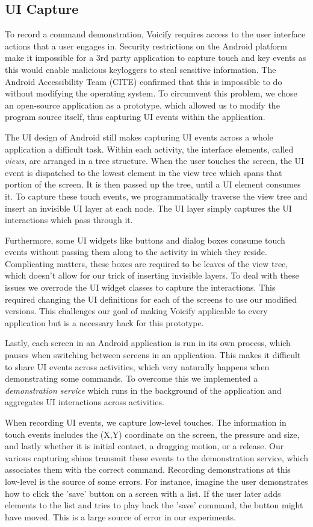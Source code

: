 \documentclass[letterpaper]{article}
\begin{document}
\subsection{UI Capture}
To record a command demonstration, Voicify requires access to the user interface actions that a user engages in.
Security restrictions on the Android platform make it impossible for a 3rd party application to capture 
touch and key events as this would enable malicious keyloggers to steal sensitive information. 
The Android Accessibility Team (CITE) confirmed that this is impossible to do without modifying the operating system.
To circumvent this problem, we chose an open-source application as a prototype, which allowed us to modify
the program source itself, thus capturing UI events within the application.

The UI design of Android still makes capturing UI events across a whole application a difficult task.
Within each activity, the interface elements, called \emph{views}, are arranged in a tree structure. When the user
touches the screen, the UI event is dispatched to the lowest element in the view tree which spans that portion of the 
screen. It is then passed up the tree, until a UI element consumes it. To capture these touch events,
we programmatically traverse the view tree and insert an invisible UI layer at each node. The UI layer
simply captures the UI interactions which pass through it.

Furthermore, some UI widgets like buttons and dialog boxes consume touch events without passing them along
to the activity in which they reside. Complicating matters, these boxes are required to be leaves
of the view tree, which doesn't allow for our trick of inserting invisible layers. To deal with these issues
we overrode the UI widget classes to capture the interactions. This required changing the UI definitions for
each of the screens to use our modified versions. This challenges our goal of making Voicify applicable to
every application but is a necessary hack for this prototype.

Lastly, each screen in an Android application is run in its own process, which pauses when switching between
screens in an application. This makes it difficult to share UI events across activities, which very naturally
happens when demonstrating some commands. To overcome this we implemented a \emph{demonstration service} which runs in the background
of the application and aggregates UI interactions across activities.

When recording UI events, we capture low-level touches. The information in touch events includes the (X,Y) coordinate
on the screen, the pressure and size, and lastly whether it is initial contact, a dragging motion, or a release.
Our various capturing shims transmit these events to the demonstration service, which associates them with the
correct command. Recording demonstrations at this low-level is the source of some errors. For instance, imagine
the user demonstrates how to click the 'save' button on a screen with a list. If the user later adds elements to the
list and tries to play back the 'save' command, the button might have moved. This is a large source of error in 
our experiments.
\end{document}
